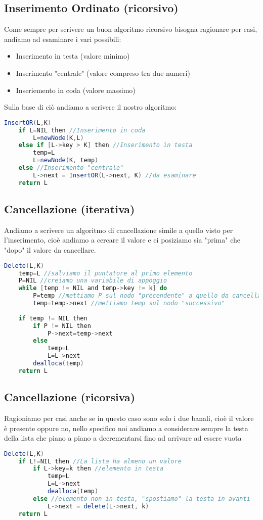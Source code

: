\subsection{Inserimento Ordinato (ricorsivo)}
Come sempre per scrivere un buon algoritmo ricorsivo bisogna ragionare per casi, andiamo ad esaminare i vari possibili:
\begin{itemize}
\item Inserimento in testa (valore minimo)
\item Inserimento "centrale" (valore compreso tra due numeri)
\item Inseriemento in coda (valore massimo)
\end{itemize}
Sulla base di ciò andiamo a scrivere il nostro algoritmo:
\begin{lstlisting}[language=Java]
InsertOR(L,K)
	if L=NIL then //Inserimento in coda
		L=newNode(K,L)
	else if [L->key > K] then //Inserimento in testa
		temp=L
		L=newNode(K, temp)
	else //Inserimento "centrale"
		L->next = InsertOR(L->next, K) //da esaminare
	return L 	
\end{lstlisting}

\subsection{Cancellazione (iterativa)}
Andiamo a scrivere un algoritmo di cancellazione simile a quello visto per l'inserimento, cioè andiamo a cercare il valore e ci posiziamo sia "prima" che "dopo" il valore da cancellare.
\newpage
\begin{lstlisting}[language=Java]
Delete(L,K)
	temp=L //salviamo il puntatore al primo elemento
	P=NIL //creiamo una variabile di appoggio
	while [temp != NIL and temp->key != k] do 
		P=temp //mettiamo P sul nodo "precendente" a quello da cancellare
		temp=temp->next //mettiamo temp sul nodo "successivo"
		
	if temp != NIL then 
		if P != NIL then 
			P->next=temp->next
		else
			temp=L
			L=L->next
		dealloca(temp)
	return L 	
\end{lstlisting}

\subsection{Cancellazione (ricorsiva)}
Ragioniamo per casi anche se in questo caso sono solo i due banali, cioè il valore è presente oppure no, nello specifico noi andiamo a considerare sempre la testa della lista che piano a piano a decrementarsi fino ad arrivare ad essere vuota
\begin{lstlisting}[language=Java]
Delete(L,K)
	if L!=NIL then //La lista ha almeno un valore
		if L->key=k then //elemento in testa
			temp=L
			L=L->next
			dealloca(temp)
		else //elemento non in testa, "spostiamo" la testa in avanti
			L->next = delete(L->next, k)
	return L
\end{lstlisting}

